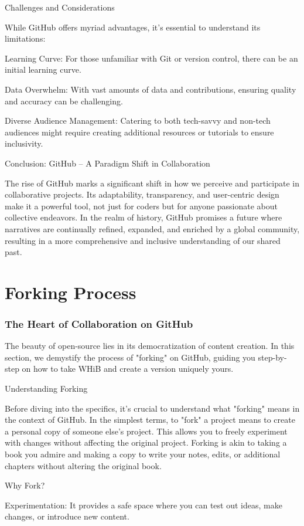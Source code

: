 \documentclass[a4paper,12pt]{book}
\begin{document}
Challenges and Considerations

While GitHub offers myriad advantages, it's essential to understand its limitations:

Learning Curve: For those unfamiliar with Git or version control, there can be an initial learning curve.

Data Overwhelm: With vast amounts of data and contributions, ensuring quality and accuracy can be challenging.

Diverse Audience Management: Catering to both tech-savvy and non-tech audiences might require creating additional resources or tutorials to ensure inclusivity.

Conclusion: GitHub – A Paradigm Shift in Collaboration

The rise of GitHub marks a significant shift in how we perceive and participate in collaborative projects. Its adaptability, transparency, and user-centric design make it a powerful tool, not just for coders but for anyone passionate about collective endeavors. In the realm of history, GitHub promises a future where narratives are continually refined, expanded, and enriched by a global community, resulting in a more comprehensive and inclusive understanding of our shared past.

\chapter{Forking Process}
\subsection*{The Heart of Collaboration on GitHub}
The beauty of open-source lies in its democratization of content creation. In this section, we demystify the process of "forking" on GitHub, guiding you step-by-step on how to take WHiB and create a version uniquely yours.

Understanding Forking

Before diving into the specifics, it's crucial to understand what "forking" means in the context of GitHub. In the simplest terms, to "fork" a project means to create a personal copy of someone else's project. This allows you to freely experiment with changes without affecting the original project. Forking is akin to taking a book you admire and making a copy to write your notes, edits, or additional chapters without altering the original book.

Why Fork?

Experimentation: It provides a safe space where you can test out ideas, make changes, or introduce new content.
\end{document}
